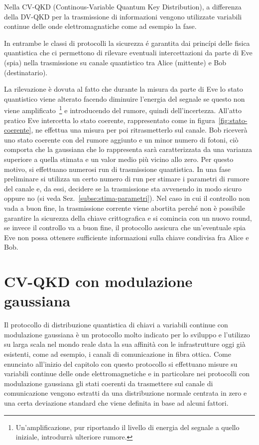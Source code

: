 Nella CV-QKD (Continous-Variable Quantum Key Distribution), a differenza della DV-QKD per la trasmissione di informazioni vengono utilizzate variabili continue delle onde elettromagnatiche come ad esempio la fase.

In entrambe le classi di protocolli la sicurezza \'e garantita dai princ\'ipi delle fisica quantistica che ci permettono di rilevare eventuali intercettazioni da parte di Eve (spia) nella trasmissione su canale quantistico tra Alice (mittente) e Bob (destinatario).

La rilevazione \`e dovuta al fatto che durante la misura da parte di Eve lo stato quantistico viene alterato facendo diminuire l'energia del segnale se questo non viene amplificato~\footnote{Un'amplificazione, pur riportando il livello di energia del segnale a quello iniziale, introdurr\`a ulteriore rumore.} e introducendo del rumore, quindi dell'incertezza. All'atto pratico Eve intercetta lo stato coerente, rappresentato come in figura~\ref{fig:stato-coerente}, ne effettua una misura per poi ritrasmetterlo sul canale. Bob ricever\`a uno stato coerente con del rumore aggiunto e un minor numero di fotoni, ci\`o comporta che la gaussiana che lo rappresenta sar\`a caratterizzata da una varianza superiore a quella stimata e un valor medio pi\`u vicino allo zero. Per questo motivo, si effettuano numerosi run di trasmissione quantistica. In una fase preliminare si utilizza un certo numero di run per stimare i parametri di rumore del canale e, da essi, decidere se la trasmissione sta avvenendo in modo sicuro oppure no (si veda Sez.~\ref{subse:stima-parametri}). Nel caso in cui il controllo non vada a buon fine, la trasmissione corrente viene abortita perch\'e non \`e possibile garantire la sicurezza della chiave crittografica e si comincia con un nuovo round, se invece il controllo va a buon fine, il protocollo assicura che un'eventuale spia Eve non possa ottenere sufficiente informazioni sulla chiave condivisa fra Alice e Bob.

\section{CV-QKD con modulazione gaussiana}
Il protocollo di distribuzione quantistica di chiavi a variabili continue con modulazione gaussiana \`e un protocollo molto indicato per lo sviluppo e l'utilizzo su larga scala nel mondo reale data la sua affinit\`a con le infrastrutture oggi gi\`a esistenti, come ad esempio, i canali di comunicazione in fibra ottica. Come enunciato all'inizio del capitolo con questo protocollo si effettuano misure su variabili continue delle onde elettromagnetiche e in particolare nei protocolli con modulazione gaussiana gli stati coerenti da trasmettere sul canale di comunicazione vengono estratti da una distribuzione normale centrata in zero e una certa deviazione standard che viene definita in base ad alcuni fattori.

